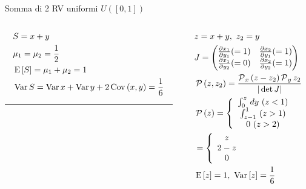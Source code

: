 \documentclass[asd-beamer.tex]{subfiles}
\begin{document}
\begin{wordonframe}{Somma di 2 RV uniformi $U([0,1])$}
	\begin{columns}[T]
		\begin{column}{0.5\textwidth}
			\begin{align*}
			&S=x+y\\
			&\mu_1=\mu_2=\frac{1}{2}\\
			&\E{[S]}=\mu_1+\mu_2=1\\
			&\var{S}=\var{x}+\var{y}+2\cov{(x,y)}=\frac{1}{6}
			\end{align*}
			\noindent\rule{0.9\textwidth}{0.4pt}
		\end{column}
		\begin{column}{0.5\textwidth}
			\begin{align*}
			&z=x+y,\ z_2=y\\
			&J=\begin{pmatrix}
			\PDy{y_1}{x_1}(=1)&\PDy{y_1}{x_2}(=1)\\
			\PDy{y_2}{x_1}(=0)&\PDy{y_2}{x_2}(=1)\\
			\end{pmatrix}\\
			&\prob{(z,z_2)}=\frac{\prob_x{(z-z_2)}\prob_y{z_2}}{|\det{J}|}\\
			&\prob{(z)}=\left\{\begin{array}{c}
			\int_0^z\,dy\ (z<1)\\
			\int_{z-1}^1\ (z>1)\\
			0\ (z>2)\\
			\end{array}\right.\\
			&=\left\{\begin{array}{c}
			z\\
			2-z\\
			0\\
			\end{array}\right.\\
			&\E{[z]}=1,\ \var{[z]}=\frac{1}{6}
			\end{align*}
		\end{column}
	\end{columns}
\end{wordonframe}
\end{document}
